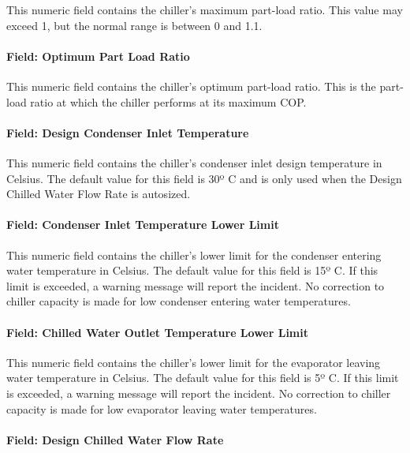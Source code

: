 This numeric field contains the chiller's maximum part-load ratio. This value may exceed 1, but the normal range is between 0 and 1.1.

\paragraph{Field: Optimum Part Load Ratio}\label{field-optimum-part-load-ratio-1-001}

This numeric field contains the chiller's optimum part-load ratio. This is the part-load ratio at which the chiller performs at its maximum COP.

\paragraph{Field: Design Condenser Inlet Temperature}\label{field-design-condenser-inlet-temperature-1}

This numeric field contains the chiller's condenser inlet design temperature in Celsius. The default value for this field is 30º C and is only used when the Design Chilled Water Flow Rate is autosized.

\paragraph{Field: Condenser Inlet Temperature Lower Limit}\label{field-condenser-inlet-temperature-lower-limit}

This numeric field contains the chiller's lower limit for the condenser entering water temperature in Celsius. The default value for this field is 15º C. If this limit is exceeded, a warning message will report the incident. No correction to chiller capacity is made for low condenser entering water temperatures.

\paragraph{Field: Chilled Water Outlet Temperature Lower Limit}\label{field-chilled-water-outlet-temperature-lower-limit-1}

This numeric field contains the chiller's lower limit for the evaporator leaving water temperature in Celsius. The default value for this field is 5º C. If this limit is exceeded, a warning message will report the incident. No correction to chiller capacity is made for low evaporator leaving water temperatures.

\paragraph{Field: Design Chilled Water Flow Rate}\label{field-design-chilled-water-flow-rate-1}

